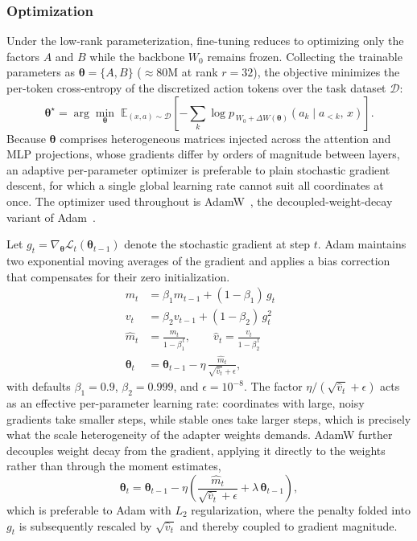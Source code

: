 \documentclass[english,12pt,a4paper,pdftex,elec,utf8]{aaltothesis}
\newcommand{\Loss}{\mathcal{L}}
\newcommand{\mhat}{\hat{m}}
\newcommand{\vhat}{\hat{v}}
\begin{document}
\subsubsection{Optimization}
\label{sec:optimization}

Under the low-rank parameterization, fine-tuning reduces to optimizing only the factors $A$ and $B$ while the backbone $W_0$ remains frozen. Collecting the trainable parameters as $\boldsymbol{\theta} = \{A, B\}$ ($\approx\!80\text{M}$ at rank $r = 32$), the objective minimizes the per-token cross-entropy of the discretized action tokens over the task dataset $\mathcal{D}$:
\begin{equation}
\boldsymbol{\theta}^\star
= \arg\min_{\boldsymbol{\theta}}\;
\mathbb{E}_{(x,a)\sim\mathcal{D}}
\left[
-\sum_{k} \log p_{\,W_0 + \Delta W(\boldsymbol{\theta})}\!\left(a_k \mid a_{<k},\, x\right)
\right].
\label{eq:objective}
\end{equation}
Because $\boldsymbol{\theta}$ comprises heterogeneous matrices injected across the attention and MLP projections, whose gradients differ by orders of magnitude between layers, an adaptive per-parameter optimizer is preferable to plain stochastic gradient descent, for which a single global learning rate cannot suit all coordinates at once. The optimizer used throughout is AdamW~\cite{loshchilov2017decoupled}, the decoupled-weight-decay variant of Adam~\cite{kingma2014adam}.

Let $g_t = \nabla_{\boldsymbol{\theta}} \Loss_t(\boldsymbol{\theta}_{t-1})$ denote the stochastic gradient at step $t$. Adam maintains two exponential moving averages of the gradient and applies a bias correction that compensates for their zero initialization.
\begin{align}
m_t &= \beta_1 m_{t-1} + (1-\beta_1)\, g_t
      \label{eq:adam-m}\\
v_t &= \beta_2 v_{t-1} + (1-\beta_2)\, g_t^{2}
      \label{eq:adam-v}\\
\mhat_t &= \frac{m_t}{1-\beta_1^{\,t}}, \qquad
\vhat_t = \frac{v_t}{1-\beta_2^{\,t}}
      \label{eq:adam-bias}\\
\boldsymbol{\theta}_t &= \boldsymbol{\theta}_{t-1}
      - \eta\, \frac{\mhat_t}{\sqrt{\vhat_t}+\epsilon},
      && \label{eq:adam-update}
\end{align}
with defaults $\beta_1 = 0.9$, $\beta_2 = 0.999$, and $\epsilon = 10^{-8}$. The factor $\eta / (\sqrt{\vhat_t}+\epsilon)$ acts as an effective per-parameter learning rate: coordinates with large, noisy gradients take smaller steps, while stable ones take larger steps, which is precisely what the scale heterogeneity of the adapter weights demands. AdamW further decouples weight decay from the gradient, applying it directly to the weights rather than through the moment estimates,
\begin{equation}
\boldsymbol{\theta}_t = \boldsymbol{\theta}_{t-1}
- \eta\left(\frac{\mhat_t}{\sqrt{\vhat_t}+\epsilon}
+ \lambda\, \boldsymbol{\theta}_{t-1}\right),
\label{eq:adamw-update}
\end{equation}
which is preferable to Adam with $L_2$ regularization, where the penalty folded into $g_t$ is subsequently rescaled by $\sqrt{\vhat_t}$ and thereby coupled to gradient magnitude.
\end{document}
